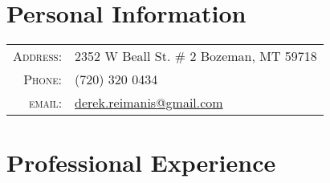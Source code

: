 \documentclass[a4paper,10pt]{article} %
\begin{document}
\pagestyle{empty} %



\par{\bigskip\par} %

\section{Personal Information}

\begin{tabular}{rl}
\textsc{Address:} & 2352 W Beall St. \# 2 Bozeman, MT 59718  \\
\textsc{Phone:} & (720) 320 0434\\
\textsc{email:} & \href{mailto:derek.reimanis@gmail.com}{derek.reimanis@gmail.com}
\end{tabular}


\section{Professional Experience}
\end{document}
